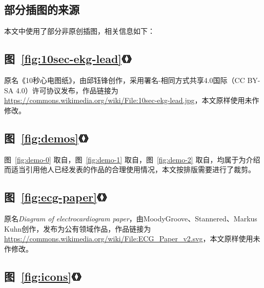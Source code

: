 

\begin{appendix}

    \begingroup
    \renewcommand{\clearpage}{\relax}
    \listoftodos
    \endgroup

    \listoffigures
    \listoffigureEng


    \chapter*{部分插图的来源}\label{ch:license}

    本文中使用了部分非原创插图，相关信息如下：

    \section*{图~\ref{fig:10sec-ekg-lead}《》}

    原名《10秒心电图纸》，由邱钰锋创作，采用署名-相同方式共享4.0国际（CC BY-SA 4.0）许可协议发布，作品链接为 \url{https://commons.wikimedia.org/wiki/File:10sec-ekg-lead.jpg}，本文原样使用未作修改。

    \section*{图~\ref{fig:demos}《》}

    图~\ref{fig:demo-0} 取自\cite{chenJiyushenduxuexidexindianfenximoxingdeshejiyuyouhua2021}，图~\ref{fig:demo-1} 取自\cite{liuJiyuyidongzhongduanfenxidekechuandairouxingxindianjiancexitong2021}，图~\ref{fig:demo-2} 取自\cite{jinPredictingCardiovascularDisease2009}，均属于为介绍而适当引用他人已经发表的作品的合理使用情况，本文按排版需要进行了裁剪。

    \section*{图~\ref{fig:ecg-paper}《》}

    原名\textit{Diagram of electrocardiogram paper}，由MoodyGroove、Stannered、Markus Kuhn创作，发布为公有领域作品，作品链接为 \url{https://commons.wikimedia.org/wiki/File:ECG_Paper_v2.svg}，本文原样使用未作修改。

    \section*{图~\ref{fig:icons}《》}


\end{appendix}
